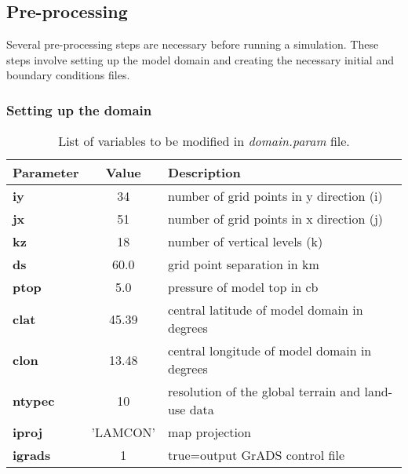 \subsection{Pre-processing}
\noindent
Several pre-processing steps are necessary before running a simulation. These steps involve setting up the model domain and creating the necessary initial and  boundary conditions files.

\subsubsection{Setting up the domain}
\begin{table}[h]
\begin{center}
\caption{List of variables to be modified in {\it domain.param} file.}  \label{domain_file}
\vspace{0.25cm}
\begin{tabular}{|l|c|l|} \hline \hline
{\small {\bf Parameter}} &  {\small {\bf Value}} & {\small {\bf Description}} \\ \hline \hline
{\footnotesize {\bf iy}}   & {\footnotesize {34} }  & {\footnotesize number of grid points in y direction (i)} \\ \hline
{\footnotesize {\bf jx}}   & {\footnotesize {51} }   & {\footnotesize number of grid points in x direction (j)} \\ \hline
{\footnotesize {\bf kz}}   & {\footnotesize {18}}    & {\footnotesize number of vertical levels (k)} \\ \hline
{\footnotesize {\bf ds}}   & {\footnotesize {60.0}}    & {\footnotesize grid point separation in km} \\ \hline
{\footnotesize {\bf ptop}} & {\footnotesize {5.0}}    & {\footnotesize pressure of model top in cb} \\ \hline
{\footnotesize {\bf clat}} & {\footnotesize {45.39}}    & {\footnotesize central latitude of model domain in degrees} \\  \hline
{\footnotesize {\bf clon}} & {\footnotesize {13.48}}    & {\footnotesize central longitude of model domain in degrees} \\  \hline
{\footnotesize {\bf ntypec}} & {\footnotesize {10}}  & {\footnotesize resolution of the global terrain and land-use data } \\ \hline
{\footnotesize {\bf iproj}}    & {\footnotesize {'LAMCON'}} & {\footnotesize map projection} \\ \hline
{\footnotesize {\bf igrads}}   & {\footnotesize {1}} & {\footnotesize true=output GrADS control file} \\ \hline

\end{tabular}
\end{center}
\end{table}
